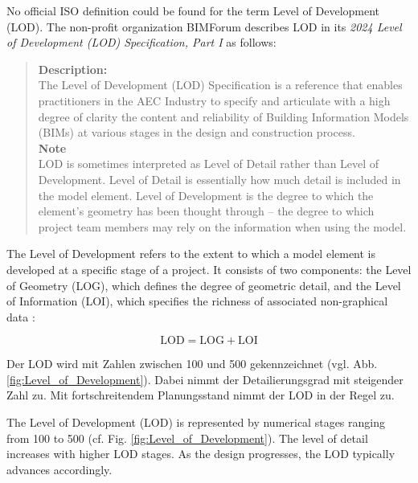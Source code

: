 \begin{English}
    No official ISO definition could be found for the term Level of Development (LOD). The non-profit organization BIMForum describes LOD in its \textit{2024 Level of Development (LOD) Specification, Part I} as follows:

    \begin{quote}
        \textbf{Description:}\\
        The Level of Development (LOD) Specification is a reference that enables practitioners in the AEC Industry to specify and articulate with a high degree of clarity the content and reliability of Building Information Models (BIMs) at various stages in the design and construction process.\\
        
        \textbf{Note}\\
        LOD is sometimes interpreted as Level of Detail rather than Level of Development. Level of Detail is essentially how much detail is included in the model element. Level of Development is the degree to which the element's geometry has been thought through -- the degree to which project team members may rely on the information when using the model.
    \end{quote}
    
    The Level of Development refers to the extent to which a model element is developed at a specific stage of a project. It consists of two components: the Level of Geometry (LOG), which defines the degree of geometric detail, and the Level of Information (LOI), which specifies the richness of associated non-graphical data \cite{astourLehrbuchGrundlagenBIMArbeitsmethode2022}:
\end{English}

    \begin{equation}
        \text{LOD} = \text{LOG} + \text{LOI}
    \end{equation}
    
 \begin{German}   
    Der LOD wird mit Zahlen zwischen 100 und 500 gekennzeichnet (vgl. Abb. \ref{fig:Level_of_Development}). Dabei nimmt der Detailierungsgrad mit steigender Zahl zu. Mit fortschreitendem Planungsstand nimmt der LOD in der Regel zu.
\end{German}
\begin{English}
    The Level of Development (LOD) is represented by numerical stages ranging from 100 to 500 (cf. Fig. \ref{fig:Level_of_Development}). The level of detail increases with higher LOD stages. As the design progresses, the LOD typically advances accordingly.
\end{English}


